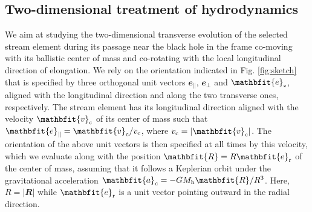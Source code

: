 \documentclass[a4paper,fleqn,usenatbib]{mnras}
\newcommand{\vect}[1]{\mathbfit{#1}}
\newcommand{\mh}{M_{\rm h}}
\begin{document}
\subsection{Two-dimensional treatment of hydrodynamics} 

\label{sec:treatment}

We aim at studying the two-dimensional transverse evolution of the selected stream element during its passage near the black hole in the frame co-moving with its ballistic center of mass and co-rotating with the local longitudinal direction of elongation. We rely on the orientation indicated in Fig. \ref{fig:sketch} that is specified by three orthogonal unit vectors $\vect{e}_{\parallel}$, $\vect{e}_{\perp}$ and $\vect{e}_{\rm z}$, aligned with the longitudinal direction and along the two transverse ones, respectively. The stream element has its longitudinal direction aligned with the velocity $\vect{v}_{\rm c}$ of its center of mass such that $\vect{e}_{\parallel} = \vect{v}_{\rm c} / v_{\rm c}$, where $v_{\rm c} = |\vect{v}_{\rm c}|$. The orientation of the above unit vectors is then specified at all times by this velocity, which we evaluate along with the position $\vect{R} = R \vect{e}_{\rm r}$ of the center of mass, assuming that it follows a Keplerian orbit under the gravitational acceleration $\vect{a}_{\rm c} = -G \mh \vect{R} / R^3$. Here, $R = |\vect{R}|$ while $\vect{e}_{\rm r}$ is a unit vector pointing outward in the radial direction. 
\end{document}
